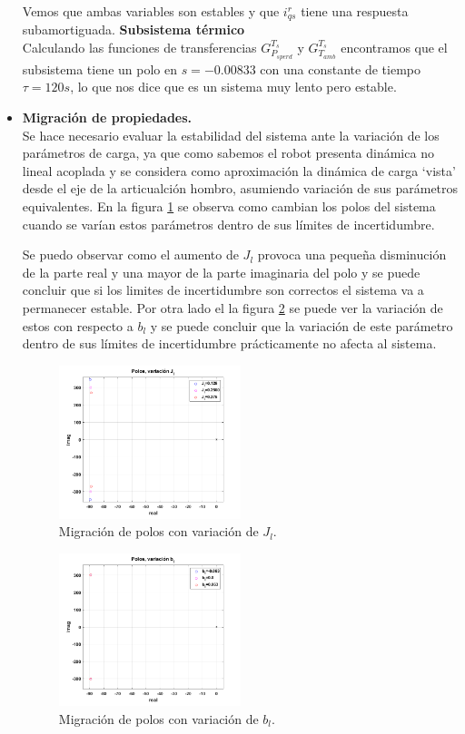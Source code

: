 \documentclass[10pt]{article}
\begin{document}
\begin{itemize}
Vemos que ambas variables son estables y que $i^{r}_{qs}$ tiene una respuesta subamortiguada.
\subitem \textbf{Subsistema térmico}\\
Calculando las funciones de transferencias  $G^{T_{s}}_{P_{s perd}}$ y $G^{T_{s}}_{T_{amb}}$ encontramos que el subsistema tiene un polo en $s=-0.00833$ con una constante de tiempo $\tau=120 s$, lo que nos dice que es un sistema muy lento pero estable.
\newpage
\item \textbf{Migración de propiedades.}\\
Se hace necesario evaluar la estabilidad del sistema ante la variación de los parámetros de carga, ya que como sabemos el robot presenta dinámica no lineal acoplada y se considera como aproximación la dinámica de carga `vista' desde el eje de la articualción hombro, asumiendo variación de sus parámetros equivalentes. En la figura \ref{fig:varpolos} se observa como cambian los polos del sistema cuando se varían estos parámetros dentro de sus límites de incertidumbre.

	Se puedo observar como el aumento de $J_{l}$ provoca una pequeña disminución de la parte real y una mayor de la parte imaginaria del polo y se puede concluir que si los limites de incertidumbre son correctos el sistema va a permanecer estable. Por otra lado el la figura \ref{fig:varpolosbl} se puede ver la variación de estos con respecto a $b_{l}$ y se puede concluir que la variación de este parámetro dentro de sus límites de incertidumbre prácticamente no afecta al sistema.
	
	\begin{figure}[h!]
	\centering
	\includegraphics[width=0.5\textwidth]{varpolos.png}
	\caption{\label{fig:varpolos} Migración de polos con variación de $J_{l}$.}
	\end{figure}
	
			\begin{figure}[h!]
	\centering
	\includegraphics[width=0.5\textwidth]{varpolosbl.png}
	\caption{\label{fig:varpolosbl} Migración de polos con variación de $b_{l}$.}
	\end{figure}

\end{itemize}
\end{document}
